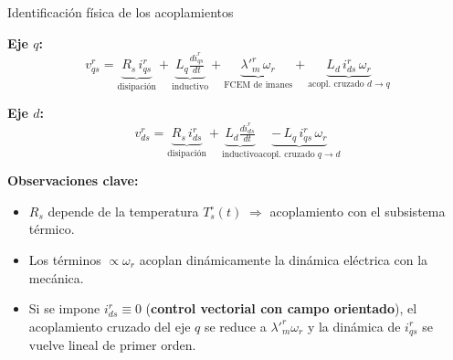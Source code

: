 \documentclass[aspectratio=169,t]{beamer}
\begin{document}
\begin{frame}{Identificación física de los acoplamientos}
\vspace{4mm}

\textbf{Eje $q$:}
\begin{equation*}
v^{r}_{qs} = \underbrace{R_s\,i^{r}_{qs}}_{\text{disipación}} + \underbrace{L_q\tfrac{di^{r}_{qs}}{dt}}_{\text{inductivo}} + \underbrace{\lambda'^r_m\,\omega_r}_{\text{FCEM de imanes}} + \underbrace{L_d\,i^{r}_{ds}\,\omega_r}_{\text{acopl.\ cruzado $d\to q$}}
\end{equation*}

\textbf{Eje $d$:}
\begin{equation*}
v^{r}_{ds} = \underbrace{R_s\,i^{r}_{ds}}_{\text{disipación}} + \underbrace{L_d\tfrac{di^{r}_{ds}}{dt}}_{\text{inductivo}} \underbrace{-\,L_q\,i^{r}_{qs}\,\omega_r}_{\text{acopl.\ cruzado $q\to d$}}
\end{equation*}

\vspace{2mm}
\textbf{Observaciones clave:}
\begin{itemize}\small
\item $R_s$ depende de la temperatura $T_s^\circ(t) \;\Rightarrow$ acoplamiento con el subsistema térmico.
\item Los términos $\propto \omega_r$ acoplan dinámicamente la dinámica eléctrica con la mecánica.
\item Si se impone $i^{r}_{ds}\equiv 0$ (\textbf{control vectorial con campo orientado}), el acoplamiento cruzado del eje $q$ se reduce a $\lambda'^r_m\omega_r$ y la dinámica de $i^{r}_{qs}$ se vuelve lineal de primer orden.
\end{itemize}
\end{frame}
\end{document}

